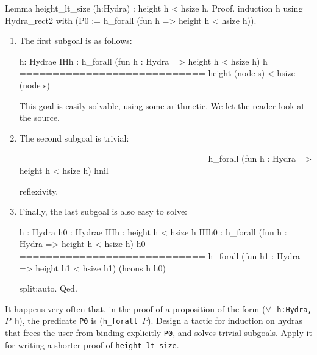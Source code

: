  \begin{Coqsrc}
Lemma height_lt_size (h:Hydra) :
 height h < hsize h.
Proof.
  induction h using Hydra_rect2  with 
  (P0 :=  h_forall (fun h =>  height h < hsize h)).
 \end{Coqsrc}

\begin{enumerate}
\item The first subgoal is as follows:

\begin{Coqanswer}

  h: Hydrae
  IHh : h_forall (fun h : Hydra => height h < hsize h) h
  ============================
   height (node s) < hsize (node s) 

\end{Coqanswer}

This goal is easily solvable, using some arithmetic. We let the reader look at the source.

\item The second subgoal is trivial:

\begin{Coqanswer}

  ============================
    h_forall (fun h : Hydra => height h < hsize h) hnil

\end{Coqanswer}

\begin{Coqsrc}
  reflexivity.
\end{Coqsrc}

\item Finally, the last subgoal is also easy to solve:



\begin{Coqanswer}
  h : Hydra
  h0 : Hydrae
  IHh : height h < hsize h
  IHh0 : h_forall (fun h : Hydra => height h < hsize h) h0
  ============================
   h_forall (fun h1 : Hydra => height h1 < hsize h1) 
                 (hcons h h0)
\end{Coqanswer}  



\begin{Coqsrc}
 split;auto. 
Qed.   
\end{Coqsrc}

\end{enumerate}


\begin{exercise}
It happens very often that, in the proof of  a proposition of the form 
(\texttt{$\forall\,$ h:Hydra, $P$ h}), the predicate \texttt{P0}
is  (\texttt{h\_forall $P$}).  Design a tactic for induction on hydras that frees the user from binding explicitly \texttt{P0},  and solves trivial subgoals. Apply it for writing  a shorter proof of \texttt{height\_lt\_size}.
\end{exercise}
 


